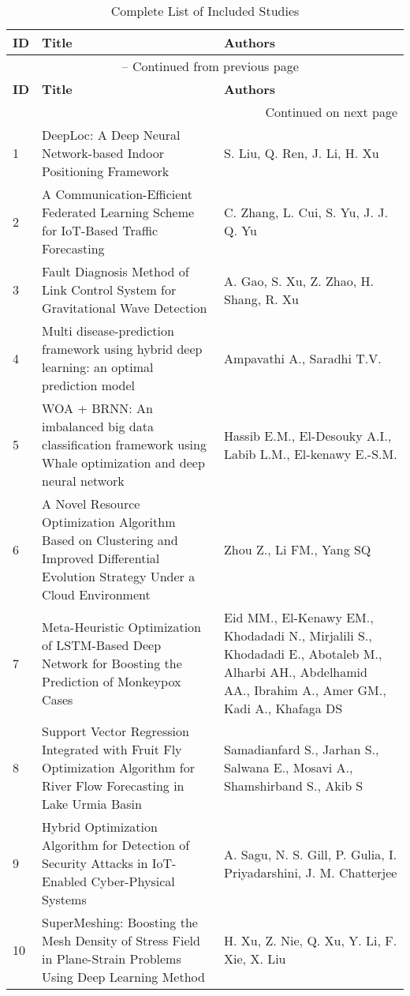 
\footnotesize
\begin{longtable}{|p{}|p{}|p{}|}

\caption{Complete List of Included Studies}\label{tab:all_papers_compact}\\
\hline
\textbf{ID} & \textbf{Title} & \textbf{Authors} \\
\hline
\endfirsthead

\multicolumn{3}{c}{\tablename\ \thetable{} -- Continued from previous page} \\
\hline
\textbf{ID} & \textbf{Title} & \textbf{Authors} \\
\hline
\endhead

\hline
\multicolumn{3}{r}{Continued on next page} \\
\endfoot

\hline
\endlastfoot

1 & DeepLoc: A Deep Neural Network-based Indoor Positioning Framework & S. Liu, Q. Ren, J. Li, H. Xu \\
\hline
2 & A Communication-Efficient Federated Learning Scheme for IoT-Based Traffic Forecasting & C. Zhang, L. Cui, S. Yu, J. J. Q. Yu \\
\hline
3 & Fault Diagnosis Method of Link Control System for Gravitational Wave Detection & A. Gao, S. Xu, Z. Zhao, H. Shang, R. Xu \\
\hline
4 & Multi disease-prediction framework using hybrid deep learning: an optimal prediction model & Ampavathi A., Saradhi T.V. \\
\hline
5 & WOA + BRNN: An imbalanced big data classification framework using Whale optimization and deep neural network & Hassib E.M., El-Desouky A.I., Labib L.M., El-kenawy E.-S.M. \\
\hline
6 & A Novel Resource Optimization Algorithm Based on Clustering and Improved Differential Evolution Strategy Under a Cloud Environment & Zhou Z., Li FM., Yang SQ \\
\hline
7 & Meta-Heuristic Optimization of LSTM-Based Deep Network for Boosting the Prediction of Monkeypox Cases & Eid MM., El-Kenawy EM., Khodadadi N., Mirjalili S., Khodadadi E., Abotaleb M., Alharbi AH., Abdelhamid AA., Ibrahim A., Amer GM., Kadi A., Khafaga DS \\
\hline
8 & Support Vector Regression Integrated with Fruit Fly Optimization Algorithm for River Flow Forecasting in Lake Urmia Basin & Samadianfard S., Jarhan S., Salwana E., Mosavi A., Shamshirband S., Akib S \\
\hline
9 & Hybrid Optimization Algorithm for Detection of Security Attacks in IoT-Enabled Cyber-Physical Systems & A. Sagu, N. S. Gill, P. Gulia, I. Priyadarshini, J. M. Chatterjee \\
\hline
10 & SuperMeshing: Boosting the Mesh Density of Stress Field in Plane-Strain Problems Using Deep Learning Method & H. Xu, Z. Nie, Q. Xu, Y. Li, F. Xie, X. Liu \\


\end{longtable}
